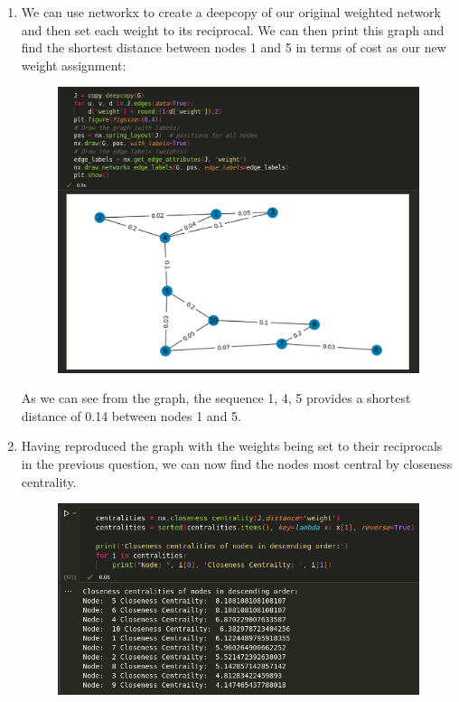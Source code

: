 \documentclass{article}
\begin{document}
\begin{enumerate}[label=(\alph*), left=10pt, itemsep=10pt]
        \item \begin{minipage}[t]{0.9\textwidth}
            We can use networkx to create a deepcopy of our original weighted network and then set each weight
            to its reciprocal. We can then print this graph and find the shortest distance between nodes 1 and 5 in
            terms of cost as our new weight assignment:
            \begin{figure}[H]
                \centering
                \includegraphics[width=1\textwidth, height=0.5\textheight]{./1h.png}
            \end{figure}
            As we can see from the graph, the sequence 1, 4, 5 provides a shortest distance of 0.14 between nodes
            1 and 5.
        \end{minipage}

        \item \begin{minipage}[t]{0.9\textwidth}
            Having reproduced the graph with the weights being set to their reciprocals in the previous question,
            we can now find the nodes most central by closeness centrality.
            \begin{figure}[H]
                \centering
                \includegraphics[width=1\textwidth, height=0.3\textheight]{./1i.png}
            \end{figure}
        \end{minipage}


\end{enumerate}
\end{document}
